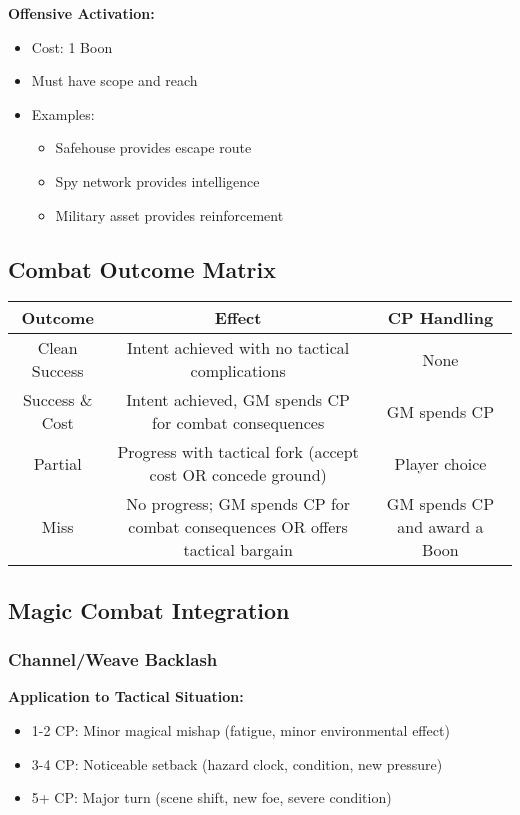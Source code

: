 \documentclass[11pt,letterpaper]{article}
\begin{document}
\textbf{Offensive Activation:}
\begin{itemize}[leftmargin=*]
    \item Cost: 1 Boon
    \item Must have scope and reach
    \item Examples:
    \begin{itemize}
        \item Safehouse provides escape route
        \item Spy network provides intelligence
        \item Military asset provides reinforcement
    \end{itemize}
\end{itemize}

\subsection{Combat Outcome Matrix}

\begin{center}
\begin{tabular}{|c|c|c|}
\hline
\textbf{Outcome} & \textbf{Effect} & \textbf{CP Handling} \\
\hline
Clean Success & Intent achieved with no tactical complications & None \\
\hline
Success \& Cost & Intent achieved, GM spends CP for combat consequences & GM spends CP \\
\hline
Partial & Progress with tactical fork (accept cost OR concede ground) & Player choice \\
\hline
Miss & No progress; GM spends CP for combat consequences OR offers tactical bargain & GM spends CP and award a Boon \\
\hline
\end{tabular}
\end{center}

\subsection{Magic Combat Integration}

\subsubsection{Channel/Weave Backlash}

\textbf{Application to Tactical Situation:}
\begin{itemize}[leftmargin=*]
    \item 1-2 CP: Minor magical mishap (fatigue, minor environmental effect)
    \item 3-4 CP: Noticeable setback (hazard clock, condition, new pressure)
    \item 5+ CP: Major turn (scene shift, new foe, severe condition)
\end{itemize}
\end{document}

